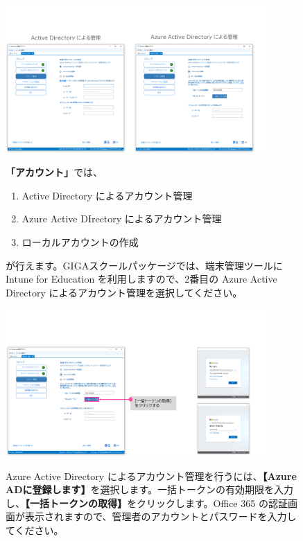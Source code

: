 \begin{figure}[hp]
    \begin{minipage}{0.6\textwidth}
        \vspace{-1cm}
        \includegraphics[width=10cm]{figures/MakeProvisioningPackage-10}
    \end{minipage}
    \begin{minipage}{0.4\textwidth}
        \textbf{「アカウント」}では、
        \begin{enumerate}
            \item Active Directory によるアカウント管理
            \item Azure Active DIrectory によるアカウント管理
            \item ローカルアカウントの作成
        \end{enumerate}
        が行えます。GIGAスクールパッケージでは、端末管理ツールに Intune for Education を利用しますので、2番目の Azure Active Directory によるアカウント管理を選択してください。
    \end{minipage}
\end{figure}

\begin{figure}[hp]
    \begin{minipage}{0.6\textwidth}
        \vspace{-1cm}
        \includegraphics[width=10cm]{figures/MakeProvisioningPackage-11}
    \end{minipage}
    \begin{minipage}{0.4\textwidth}
        Azure Active Directory によるアカウント管理を行うには、\textbf{【Azure ADに登録します】}を選択します。一括トークンの有効期限を入力し、\textbf{【一括トークンの取得】}をクリックします。Office 365 の認証画面が表示されますので、管理者のアカウントとパスワードを入力してください。
    \end{minipage}
\end{figure}

